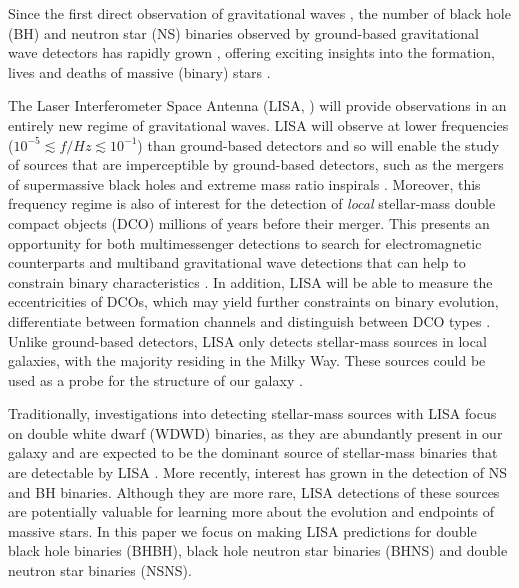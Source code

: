 Since the first direct observation of gravitational waves \citep{Abbott+2016_first_detection}, the number of black hole (BH) and neutron star (NS) binaries observed by ground-based gravitational wave detectors has rapidly grown \citep{Abbott+2019_GWTC1,Abbott+2020_GWTC2}, offering exciting insights into the formation, lives and deaths of massive (binary) stars \citep[e.g.][]{Abbott+2021_GWTC2_inference}.

The Laser Interferometer Space Antenna (LISA, \citealp{Amaro-Seoane+2017, Colpi+2019}) will provide observations in an entirely new regime of gravitational waves. LISA will observe at lower frequencies ($10^{-5} \lesssim f / \unit{Hz} \lesssim 10^{-1}$) than ground-based detectors and so will enable the study of sources that are imperceptible by ground-based detectors, such as the mergers of supermassive black holes and extreme mass ratio inspirals \citep[e.g.][]{Begelman+1980, Klein+2016}. Moreover, this frequency regime is also of interest for the detection of \textit{local} stellar-mass double compact objects (DCO) millions of years before their merger. This presents an opportunity for both multimessenger detections to search for electromagnetic counterparts and multiband gravitational wave detections that can help to constrain binary characteristics \citep[e.g.][]{Sesana+2016, Gerosa+2019}. In addition, LISA will be able to measure the eccentricities of DCOs, which may yield further constraints on binary evolution, differentiate between formation channels and distinguish between DCO types \citep[e.g.][]{Nelemans+2001, Breivik+2016, Antonini+2017, Rodriguez+2018}. Unlike ground-based detectors, LISA only detects stellar-mass sources in local galaxies, with the majority residing in the Milky Way. These sources could be used as a probe for the structure of our galaxy \citep[e.g.][]{Korol+2019}.

Traditionally, investigations into detecting stellar-mass sources with LISA focus on double white dwarf (WDWD) binaries, as they are abundantly present in our galaxy and are expected to be the dominant source of stellar-mass binaries that are detectable by LISA \citep{Nelemans+2001,Ruiter+2010,Yu+2010,Nissanke+2012,Korol+2017,Lamberts+2018}. More recently, interest has grown in the detection of NS and BH binaries. Although they are more rare, LISA detections of these sources are potentially valuable for learning more about the evolution and endpoints of massive stars. In this paper we focus on making LISA predictions for double black hole binaries (BHBH), black hole neutron star binaries (BHNS) and double neutron star binaries (NSNS).

